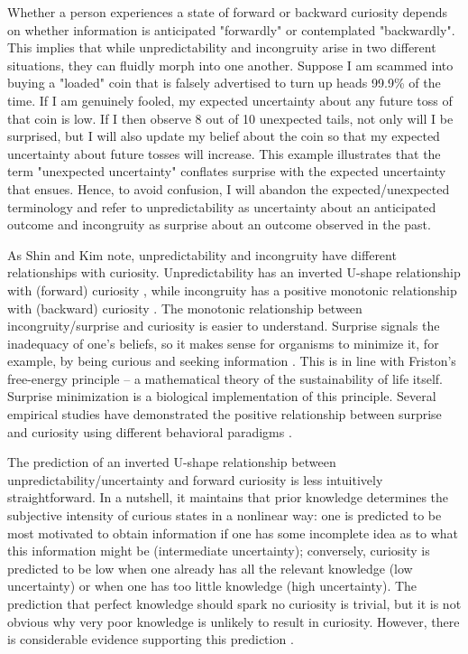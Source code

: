 Whether a person experiences a state of forward or backward curiosity depends on whether information is anticipated "forwardly" or contemplated "backwardly". This implies that while unpredictability and incongruity arise in two different situations, they can fluidly morph into one another. Suppose I am scammed into buying a "loaded" coin that is falsely advertised to turn up heads 99.9\% of the time. If I am genuinely fooled, my expected uncertainty about any future toss of that coin is low. If I then observe 8 out of 10 unexpected tails, not only will I be surprised, but I will also update my belief about the coin so that my expected uncertainty about future tosses will increase. This example illustrates that the term "unexpected uncertainty" conflates surprise \cite{barto_novelty_2013} with the expected uncertainty that ensues. Hence, to avoid confusion, I will abandon the expected/unexpected terminology and refer to unpredictability as uncertainty about an anticipated outcome and incongruity as surprise about an outcome observed in the past.

As Shin and Kim \cite{shin_homo_2019} note, unpredictability and incongruity have different relationships with curiosity. Unpredictability has an inverted U-shape relationship with (forward) curiosity \cite{berlyne_theory_1954,day_curiosity_1982,loewenstein_psychology_1994}, while incongruity has a positive monotonic relationship with (backward) curiosity \cite{horstmann_surprise-attention_2015}. The monotonic relationship between incongruity/surprise and curiosity is easier to understand. Surprise signals the inadequacy of one's beliefs, so it makes sense for organisms to minimize it, for example, by being curious and seeking information \cite{schwartenbeck_computational_2019}. This is in line with Friston's \cite{friston_free-energy_2009} free-energy principle -- a mathematical theory of the sustainability of life itself. Surprise minimization is a biological implementation of this principle. Several empirical studies have demonstrated the positive relationship between surprise and curiosity using different behavioral paradigms \cite{berlyne_experimental_1954,itti_bayesian_2009,poli_infants_2020}.

The prediction of an inverted U-shape relationship between unpredictability/uncertainty and forward curiosity is less intuitively straightforward. In a nutshell, it maintains that prior knowledge determines the subjective intensity of curious states in a nonlinear way: one is predicted to be most motivated to obtain information if one has some incomplete idea as to what this information might be (intermediate uncertainty); conversely, curiosity is predicted to be low when one already has all the relevant knowledge (low uncertainty) or when one has too little knowledge (high uncertainty). The prediction that perfect knowledge should spark no curiosity is trivial, but it is not obvious why very poor knowledge is unlikely to result in curiosity. However, there is considerable evidence supporting this prediction \cite{berlyne_experimental_1954,day_prior_1972,loewenstein_psychology_1994,kang_wick_2009,baranes_eye_2015}.

